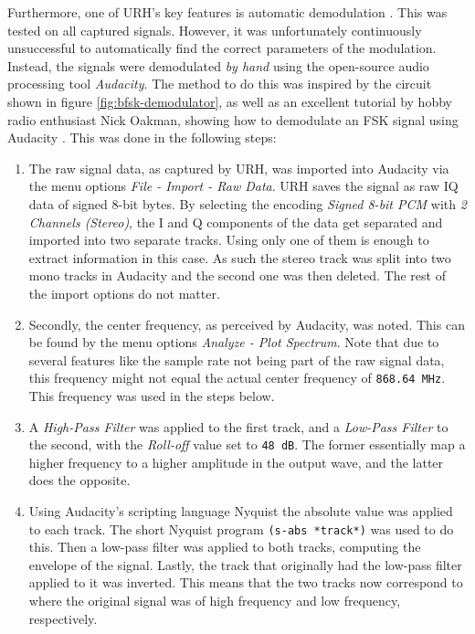 Furthermore, one of \gls{URH}'s key features is automatic demodulation \cite{urh}. This was tested on all captured signals. However, it was unfortunately continuously unsuccessful to automatically find the correct parameters of the modulation. Instead, the signals were demodulated \textit{by hand} using the open-source audio processing tool \textit{Audacity}. The method to do this was inspired by the circuit shown in figure \ref{fig:bfsk-demodulator}, as well as an excellent tutorial by hobby radio enthusiast Nick Oakman, showing how to demodulate an FSK signal using Audacity \cite{oakman-fsk}. This was done in the following steps:
\begin{enumerate}
    \item The raw signal data, as captured by URH, was imported into Audacity via the menu options \textit{File - Import - Raw Data}. URH saves the signal as raw IQ data of signed 8-bit bytes. By selecting the encoding \textit{Signed 8-bit PCM} with \textit{2 Channels (Stereo)}, the I and Q components of the data get separated and imported into two separate tracks. Using only one of them is enough to extract information in this case. As such the stereo track was split into two mono tracks in Audacity and the second one was then deleted. The rest of the import options do not matter.

    \item Secondly, the center frequency, as perceived by Audacity, was noted. This can be found by the menu options \textit{Analyze - Plot Spectrum}. Note that due to several features like the sample rate not being part of the raw signal data, this frequency might not equal the actual center frequency of \texttt{868.64 MHz}. This frequency was used in the steps below.

    \item A \textit{High-Pass Filter} was applied to the first track, and a \textit{Low-Pass Filter} to the second, with the \textit{Roll-off} value set to \texttt{48 dB}. The former essentially map a higher frequency to a higher amplitude in the output wave, and the latter does the opposite.

    \item Using Audacity's scripting language Nyquist the absolute value was applied to each track. The short Nyquist program \texttt{(s-abs *track*)} was used to do this. Then a low-pass filter was applied to both tracks, computing the envelope of the signal. Lastly, the track that originally had the low-pass filter applied to it was inverted. This means that the two tracks now correspond to where the original signal was of high frequency and low frequency, respectively.


\end{enumerate}
